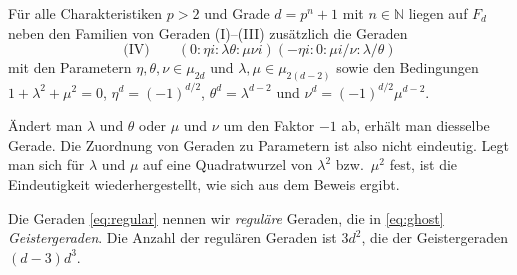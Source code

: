 \begin{theorem}[Geistergeraden]
Für alle Charakteristiken $p > 2$ und Grade $d = p^n + 1$ mit $n \in \mathbb N$ liegen auf $F_d$ neben den Familien von Geraden (I)--(III) zusätzlich die Geraden
\begin{equation} \label{eq:ghost}
\text{(IV)}\qquad (0:\eta i:\lambda\theta:\mu\nu i)(-\eta i:0:\mu i/\nu:\lambda/\theta)
\end{equation}
mit den Parametern $\eta, \theta, \nu \in \mu_{2d}$ und $\lambda, \mu \in \mu_{2(d-2)}$ sowie den Bedingungen $1+\lambda^2+\mu^2 = 0$, $\eta^d = (-1)^{d/2}$, $\theta^d = \lambda^{d-2}$ und $\nu^d = (-1)^{d/2}\mu^{d-2}$.
\end{theorem}
\begin{remarks}
Ändert man $\lambda$ und $\theta$ oder $\mu$ und $\nu$ um den Faktor $-1$ ab, erhält man diesselbe Gerade. Die Zuordnung von Geraden zu Parametern ist also nicht eindeutig. Legt man sich für $\lambda$ und $\mu$ auf eine Quadratwurzel von $\lambda^2$ bzw.~$\mu^2$ fest, ist die Eindeutigkeit wiederhergestellt, wie sich aus dem Beweis ergibt.
\end{remarks}
Die Geraden \eqref{eq:regular} nennen wir \emph{reguläre} Geraden, die in \eqref{eq:ghost} \emph{Geistergeraden}. Die Anzahl der regulären Geraden ist $3d^2$, die der Geistergeraden $(d-3)d^3$.
